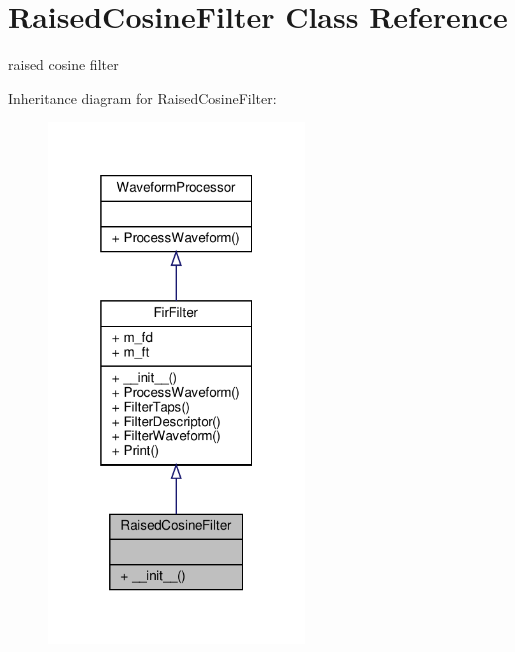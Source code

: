 \hypertarget{classSignalIntegrity_1_1TimeDomain_1_1Filters_1_1RaisedCosineFilter_1_1RaisedCosineFilter}{}\section{Raised\+Cosine\+Filter Class Reference}
\label{classSignalIntegrity_1_1TimeDomain_1_1Filters_1_1RaisedCosineFilter_1_1RaisedCosineFilter}


raised cosine filter  




Inheritance diagram for Raised\+Cosine\+Filter\+:
\nopagebreak
\begin{figure}[H]
\begin{center}
\leavevmode
\includegraphics[width=193pt]{classSignalIntegrity_1_1TimeDomain_1_1Filters_1_1RaisedCosineFilter_1_1RaisedCosineFilter__inherit__graph}
\end{center}
\end{figure}


